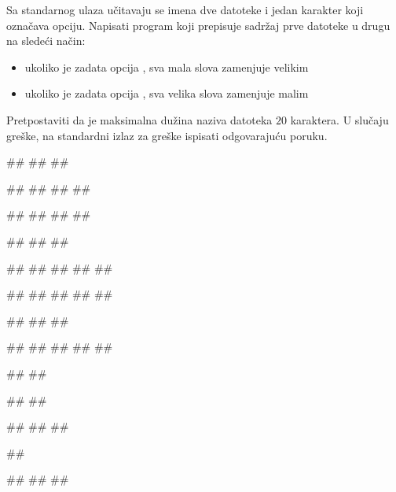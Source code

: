 \begin{Exercise}[label=p3_iv3] 
Sa standarnog ulaza učitavaju se imena dve datoteke i
jedan karakter koji označava opciju. 
Napisati program koji prepisuje sadržaj prve datoteke u drugu na sledeći način:
\begin{itemize}
\item ukoliko je zadata opcija , sva mala slova zamenjuje velikim
\item ukoliko je zadata opcija , sva velika slova zamenjuje malim
\end{itemize}
Pretpostaviti da je maksimalna dužina naziva datoteka $20$ karaktera. 
U slučaju greške, na standardni izlaz za greške ispisati odgovarajuću poruku.

\begin{miditest}
\begin{upotreba}{1}
#\naslovInt#
##
##

##
##
##
##

##
##
##
##
\end{upotreba}
\end{miditest}
\begin{miditest}
\begin{upotreba}{2}
#\naslovInt#
##
##

##
##
##
##
##

##
##
##
##
##
\end{upotreba}
\end{miditest}

\begin{miditest}
\begin{upotreba}{3}
#\naslovInt#
##
##

##
##
##
#\datoteka{\{}#
#\datoteka{\}}#

##
#\datoteka{}#

#\naslovIzlazZaGresku#
##
\end{upotreba}
\end{miditest}
\begin{miditest}
\begin{upotreba}{4}
#\naslovInt#
##
##

##

#\naslovIzlazZaGresku#
##
##
\end{upotreba}
\end{miditest}
\end{Exercise}
